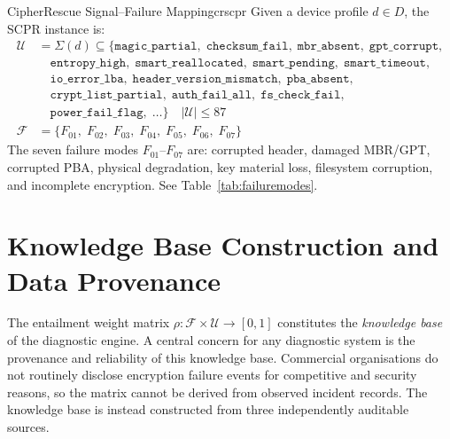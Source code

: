\documentclass[11pt,a4paper]{report}
\newcommand{\calU}{\mathcal{U}}
\newcommand{\calF}{\mathcal{F}}
\begin{document}
\begin{definition}{CipherRescue Signal--Failure Mapping}{crscpr}
Given a device profile $d \in D$, the SCPR instance is:
\begin{align*}
\calU &= \Sigma(d) \subseteq \{\mathtt{magic\_partial},\; \mathtt{checksum\_fail},\; \mathtt{mbr\_absent},\; \mathtt{gpt\_corrupt},\\
&\quad \mathtt{entropy\_high},\; \mathtt{smart\_reallocated},\; \mathtt{smart\_pending},\; \mathtt{smart\_timeout},\\
&\quad \mathtt{io\_error\_lba},\; \mathtt{header\_version\_mismatch},\; \mathtt{pba\_absent},\\
&\quad \mathtt{crypt\_list\_partial},\; \mathtt{auth\_fail\_all},\; \mathtt{fs\_check\_fail},\\
&\quad \mathtt{power\_fail\_flag},\; \ldots\} \quad |\calU| \leq 87 \\[6pt]
\calF &= \{F_{01},\; F_{02},\; F_{03},\; F_{04},\; F_{05},\; F_{06},\; F_{07}\}
\end{align*}
The seven failure modes $F_{01}$--$F_{07}$ are: corrupted header, damaged MBR/GPT, corrupted PBA, physical degradation, key material loss, filesystem corruption, and incomplete encryption. See Table~\ref{tab:failuremodes}.
\end{definition}

\section{Knowledge Base Construction and Data Provenance}
\label{sec:kb-provenance}

The entailment weight matrix $\rho : \calF \times \calU \to [0,1]$ constitutes the \emph{knowledge base} of the diagnostic engine. A central concern for any diagnostic system is the provenance and reliability of this knowledge base. Commercial organisations do not routinely disclose encryption failure events for competitive and security reasons, so the matrix cannot be derived from observed incident records. The knowledge base is instead constructed from three independently auditable sources.
\end{document}
